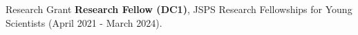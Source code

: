 \begin{rSection}{Research Grant}
{\bf Research Fellow (DC1)}, JSPS Research Fellowships for Young Scientists (April 2021 - March 2024).
\end{rSection}